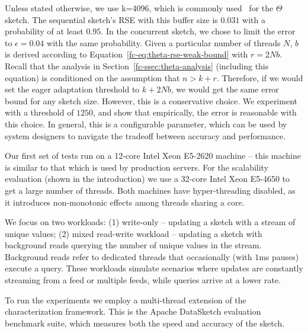 Unless stated otherwise, we use k=4096, which is commonly used~\cite{DataSketches} for the $\Theta$ sketch.
The sequential sketch’s RSE with this buffer size is $0.031$ with a probability of at
least $0.95$. In the concurrent sketch, we chose to limit the error to $\epsilon = 0.04$ with the
same probability. Given a particular number of threads $N$, $b$ is derived according to
Equation~\ref{fc-eq:theta-rse-weak-bound} with $r = 2Nb$. Recall that the analysis in Section~\ref{fc-ssec:theta-analysis}
(including this equation) is
conditioned on the assumption that $n > k + r$. Therefore, if we would set the eager
adaptation threshold to $k+2Nb$, we would get the same error bound for any sketch size.
However, this is a conservative choice. We experiment with a threshold of $1250$,
and show that empirically, the error is reasonable with this choice. In general, this is
a configurable parameter, which can be used by system designers to navigate the tradeoff between
accuracy and performance.

Our first set of tests run on a 12-core Intel Xeon E5-2620 machine -- this machine is similar
to that which is used by production servers. For the scalability evaluation (shown in the introduction) we use a 32-core Intel Xeon
E5-4650 to get a large number of threads. Both machines have hyper-threading disabled, as it introduces
non-monotonic effects among threads sharing a core.

We focus on two workloads: (1) write-only -- updating a sketch with a stream of unique values; (2) mixed
read-write workload -- updating a sketch with background reads querying the number of unique values in
the stream. Background reads refer to dedicated threads that occasionally (with $1$ms pauses) execute a query.
These workloads simulate scenarios where updates are constantly streaming from
a feed or multiple feeds, while queries arrive at a lower rate.

To run the experiments we employ a multi-thread extension of the characterization
framework. This is the Apache DataSketch evaluation benchmark suite, which measures
both the speed and accuracy of the sketch. 

